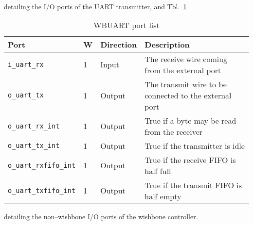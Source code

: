 \documentclass{gqtekspec}
\begin{document}
detailing the I/O ports of the UART transmitter, and Tbl.~\ref{tbl:wbports}
\begin{table}\begin{center}\begin{tabular}{|p{1.15in}|p{0.1in}|p{0.75in}|p{3.375in}|}
\rowcolor[gray]{0.85} Port & W & Direction & Description \\\hline\hline
{\tt i\_uart\_rx}& 1 & Input & The receive wire coming from the external port\\\hline
{\tt o\_uart\_tx}& 1 & Output & The transmit wire to be connected to the external port\\\hline
{\tt o\_uart\_rx\_int}	& 1 & Output & True if a byte may be read from the receiver\\\hline
{\tt o\_uart\_tx\_int}	& 1 & Output & True if the transmitter is idle\\\hline
{\tt o\_uart\_rxfifo\_int}&1& Output & True if the receive FIFO is half full\\\hline
{\tt o\_uart\_txfifo\_int}&1& Output & True if the transmit FIFO is half empty\\\hline
\end{tabular}\caption{WBUART port list}\label{tbl:wbports}
\end{center}\end{table}
detailing the non--wishbone I/O ports of the wishbone controller.



\end{document}
